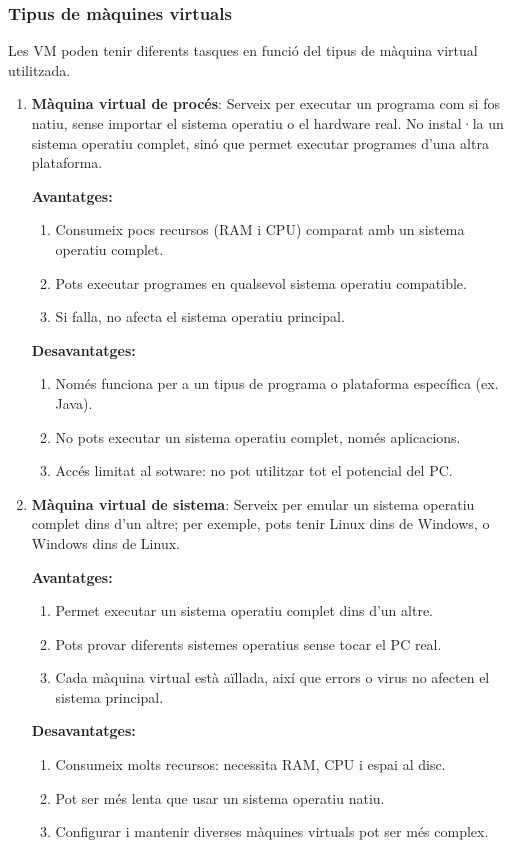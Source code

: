 \subsubsection{Tipus de màquines virtuals}
Les VM poden tenir diferents tasques en funció del tipus de màquina virtual utilitzada.
\begin{enumerate}
 \item \textbf{Màquina virtual de procés}: Serveix per executar un programa com si fos natiu, sense importar el sistema operatiu o el hardware real. No instal·la un sistema operatiu complet, sinó que permet executar programes d’una altra plataforma.

 \textbf{Avantatges:}
 \begin{enumerate}[1)]
  \item Consumeix pocs recursos (RAM i CPU) comparat amb un sistema operatiu complet.
  \item Pots executar programes en qualsevol sistema operatiu compatible.
  \item Si falla, no afecta el sistema operatiu principal.
 \end{enumerate}
 \textbf{Desavantatges:}
 \begin{enumerate}[1)]
  \item Només funciona per a un tipus de programa o plataforma específica (ex. Java).
  \item No pots executar un sistema operatiu complet, només aplicacions.
  \item Accés limitat al sotware: no pot utilitzar tot el potencial del PC.
 \end{enumerate}

 \item \textbf{Màquina virtual de sistema}: Serveix per emular un sistema operatiu complet dins d’un altre; per exemple, pots tenir Linux dins de Windows, o Windows dins de Linux.

  \textbf{Avantatges:}
 \begin{enumerate}[1)]
  \item Permet executar un sistema operatiu complet dins d’un altre.
  \item Pots provar diferents sistemes operatius sense tocar el PC real.
  \item Cada màquina virtual està aïllada, així que errors o virus no afecten el sistema principal.
 \end{enumerate}
 \textbf{Desavantatges:}
 \begin{enumerate}[1)]
  \item Consumeix molts recursos: necessita RAM, CPU i espai al disc.
  \item Pot ser més lenta que usar un sistema operatiu natiu.
  \item Configurar i mantenir diverses màquines virtuals pot ser més complex.
 \end{enumerate}
\end{enumerate}

